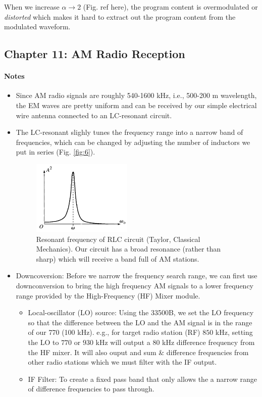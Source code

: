 \documentclass[../main.tex]{subfiles}
\begin{document}
When we increase $\alpha \to 2$ (Fig. ref here), the program content is overmodulated or \textit{distorted} which makes it hard to extract
out the program content from the modulated waveform. 


\subsection*{Chapter 11: AM Radio Reception}

\paragraph*{Notes}
\begin{itemize}
    \item Since AM radio signals are roughly 540-1600 kHz, i.e., 500-200 m wavelength, the EM waves are pretty uniform and can be received by our simple electrical wire antenna connected to an LC-resonant circuit. 
    \item The LC-resonant slighly tunes the frequency range into a narrow band of frequencies, which can be changed by adjusting the number of inductors we put in series (Fig. \ref{fig:6}).
    \begin{figure}[ht]
        \centering
        \includegraphics[width=0.45\textwidth]{fig2_11.png}
        \captionsetup{width=0.8\textwidth}
        \caption{Resonant frequency of RLC circuit (Taylor, Classical Mechanics). Our circuit has a broad resonance (rather than sharp) which will receive a band full of AM stations.}
        \label{fig:7}
    \end{figure}
    \item Downcoversion: Before we narrow the frequency search range, we can first use downconversion to bring the high frequency AM signals to a lower frequency range provided by the High-Frequency (HF) Mixer module.
    \begin{itemize}
        \item Local-oscillator (LO) source: Using the 33500B, we set the LO frequency so that the difference between the LO and the AM signal is in the range of our 770 (100 kHz). 
        e.g., for target radio station (RF) $850$ kHz, setting the LO to $770$ or $930$ kHz will output a $80$ kHz difference frequency from the HF mixer. It will also ouput and sum \& difference frequencies from other radio stations which we must filter with the IF output.
        \item IF Filter: To create a fixed pass band that only allows the a narrow range of difference frequencies to pass through.
    \end{itemize}
\end{itemize}
\end{document}
